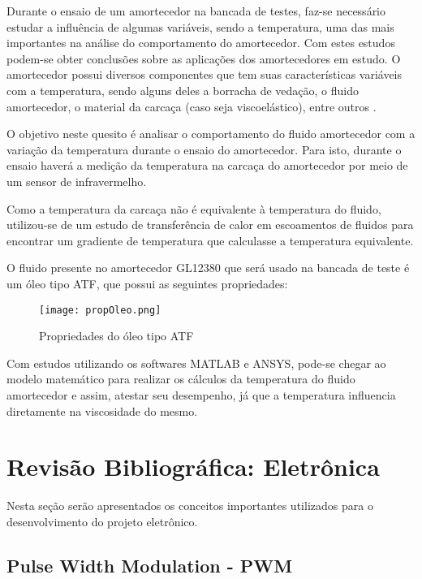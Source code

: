 			Durante o ensaio de um amortecedor na bancada de testes, faz-se necessário estudar a influência de algumas variáveis, sendo a temperatura, uma das mais importantes na análise do comportamento do amortecedor. Com estes estudos podem-se obter conclusões sobre as aplicações dos amortecedores em estudo. O amortecedor possui diversos componentes que tem suas características variáveis com a temperatura, sendo alguns deles a borracha de vedação, o fluido amortecedor, o material da carcaça (caso seja viscoelástico), entre outros \cite{Aseka}.

			O objetivo neste quesito é analisar o comportamento do fluido amortecedor com a variação da temperatura durante o ensaio do amortecedor. Para isto, durante o ensaio haverá a medição da temperatura na carcaça do amortecedor por meio de um sensor de infravermelho.
		
			Como a temperatura da carcaça não é equivalente à temperatura do fluido, utilizou-se de um estudo de transferência de calor em escoamentos de fluidos para encontrar um gradiente de temperatura que calculasse a temperatura equivalente.
		
			O fluido presente no amortecedor GL12380 que será usado na bancada de teste é um óleo tipo ATF, que possui as seguintes propriedades:

			\begin{figure}[!h]
				\centering
				\texttt{[image: propOleo.png]}
				\caption[Propriedades do óleo tipo ATF]{Propriedades do óleo tipo ATF \cite{Petrobras}} 
				\label{propOleo}
			\end{figure}

			Com estudos utilizando os softwares MATLAB e ANSYS, pode-se chegar ao modelo matemático para realizar os cálculos da temperatura do fluido amortecedor e assim, atestar seu desempenho, já que a temperatura influencia diretamente na viscosidade do mesmo.



	\newpage
	\section{Revisão Bibliográfica: Eletrônica}

	Nesta seção serão apresentados os conceitos importantes utilizados para o desenvolvimento do projeto eletrônico. 

		\subsection{Pulse Width Modulation - PWM}
			

